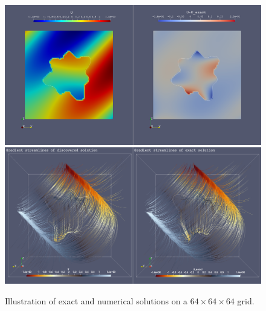 \documentclass{elsarticle}
\begin{document}
\begin{figure}
	\centering
	\includegraphics[width=\linewidth]{./figures/star_sols_regression_64x64x64.png}
	\includegraphics[width=\linewidth]{./figures/star_grad_sols_regression_64x64x64.png}
	\caption{Illustration of exact and numerical solutions on a $64\times 64 \times 64$ grid.}
	\label{fig:star_sol}
\end{figure}
\end{document}
